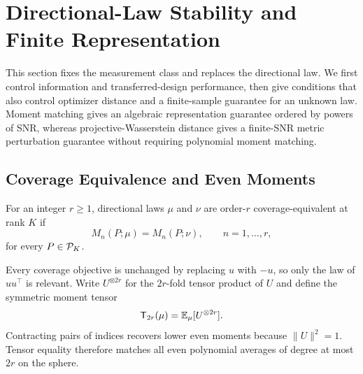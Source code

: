 \section{Directional-Law Stability and Finite Representation}
This section fixes the measurement class and replaces the directional law. We first
control information and transferred-design performance, then give conditions that
also control optimizer distance and a finite-sample guarantee for an unknown law.
Moment matching gives an algebraic representation guarantee ordered by powers of
SNR, whereas projective-Wasserstein distance gives a finite-SNR metric
perturbation guarantee without requiring polynomial moment matching.

\subsection{Coverage Equivalence and Even Moments}
\begin{definition}
For an integer $r\ge1$, directional laws $\mu$ and $\nu$ are order-$r$ coverage-equivalent at rank $K$ if
\begin{equation}
M_n(P;\mu)=M_n(P;\nu),\qquad n=1,\ldots,r,
\label{eq:equiv_def}
\end{equation}
for every $P\in\mathcal P_K$.
\end{definition}

Every coverage objective is unchanged by replacing $u$ with $-u$, so only the law of $uu^{\top}$ is relevant. Write $U^{\otimes 2r}$ for the $2r$-fold tensor product of $U$ and define the symmetric moment tensor
\begin{equation}
\mathsf T_{2r}(\mu)=\mathbb E_\mu[U^{\otimes 2r}].
\end{equation}
Contracting pairs of indices recovers lower even moments because $\|U\|^2=1$. Tensor equality therefore matches all even polynomial averages of degree at most $2r$ on the sphere.

